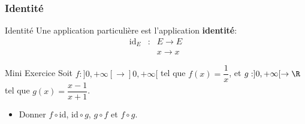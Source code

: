 \begin{frame}[t]
  \frametitle{Identité}
  \small
 \begin{block}{Identité}
   Une application particulière est l'application \textbf{\textbf{identité}}:
   \begin{eqnarray*}
     \text{id}_E &:& E\rightarrow E\\
                && x \rightarrow x
   \end{eqnarray*}
 \end{block} 
 \pause

 \begin{block}{Mini Exercice}
   Soit $f: ]0,+\infty[\rightarrow ]0,+\infty[$ tel que $f(x)=\dfrac{1}{x}$, et
   $g: ]0,+\infty[\rightarrow \R$  tel que $g(x) = \dfrac{x-1}{x+1}$.
   \begin{itemize}
     \item Donner $f\circ\text{id}$, $\text{id}\circ g$, $g\circ f$ et $f\circ
       g$.
   \end{itemize}
 \end{block}
\end{frame}
